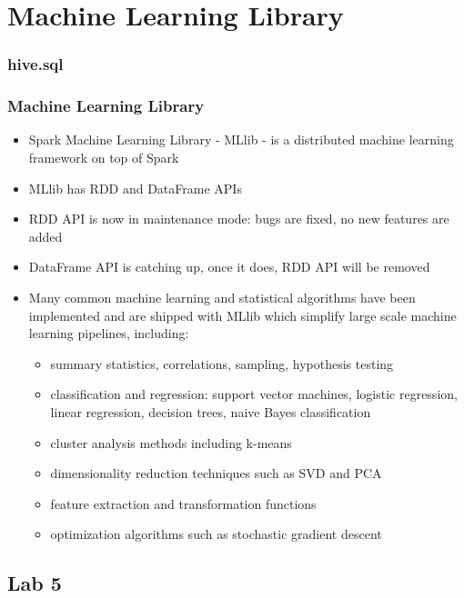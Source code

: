 \section{Machine Learning Library}
\subsubsection{hive.sql}
\begin{frame}[fragile]
\frametitle{Machine Learning Library}
\begin{itemize}
\item Spark Machine Learning Library - {\color{mycolordef}MLlib} - is a distributed machine learning framework on top of Spark
\item MLlib has RDD and DataFrame APIs
\item RDD API is now in maintenance mode: bugs are fixed, no new features are added
\item DataFrame API is catching up, once it does, RDD API will be removed
\item Many common machine learning and statistical algorithms have been implemented and are shipped with MLlib which simplify large scale machine learning pipelines, including:
  \begin{itemize}
    \item summary statistics, correlations, sampling, hypothesis testing
    \item classification and regression: support vector machines, logistic regression, linear regression, decision trees, naive Bayes classification
    \item cluster analysis methods including k-means
    \item dimensionality reduction techniques such as SVD and PCA
    \item feature extraction and transformation functions
    \item optimization algorithms such as stochastic gradient descent
  \end{itemize}
\end{itemize}
\end{frame}

\subsection{Lab 5}

